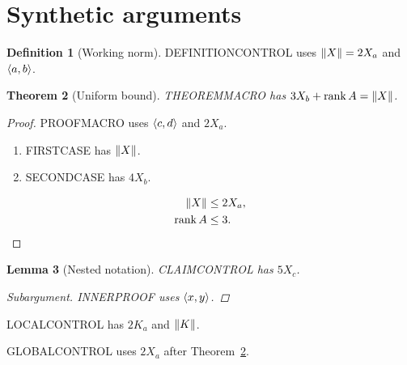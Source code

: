 \documentclass{amsart}
\newtheorem{theorem}{Theorem}[section]
\newtheorem{lemma}[theorem]{Lemma}
\theoremstyle{definition}
\newtheorem{definition}[theorem]{Definition}
\newenvironment{claim}[1][Auxiliary]{\begin{lemma}[#1]}{\end{lemma}}
\newcommand{\base}{X}
\newcommand{\weight}[2][2]{#1\base_{#2}}
\DeclareMathOperator{\rank}{rank}
\DeclarePairedDelimiter{\norm}{\lVert}{\rVert}
\begin{document}
\section{Synthetic arguments}
\begin{definition}[Working norm]
DEFINITIONCONTROL uses $\norm{\base}=\weight{a}$ and $\pair{b}$.
\end{definition}

\begin{theorem}[Uniform bound]\label{thm:bound}
THEOREMMACRO has $\weight[3]{b}+\rank A=\norm*{\base}$.
\end{theorem}
\begin{proof}
PROOFMACRO uses $\pair[c]{d}$ and $\weight{a}$.

\begin{enumerate}
\item FIRSTCASE has $\norm{\base}$.
\item SECONDCASE has $\weight[4]{b}$.
\end{enumerate}
\begin{align*}
\norm{\base} &\leq \weight{a},\\
\rank A &\leq 3.\qedhere
\end{align*}
\end{proof}

\begin{claim}[Nested notation]
CLAIMCONTROL has $\weight[5]{c}$.
\begin{proof}[Subargument]
INNERPROOF uses $\pair[x]{y}$.
\end{proof}
\end{claim}

{\renewcommand{\base}{K}\color{blue}
LOCALCONTROL has $\weight{a}$ and $\norm{\base}$.\par}

GLOBALCONTROL uses $\weight{a}$ after Theorem~\ref{thm:bound}.
\end{document}
